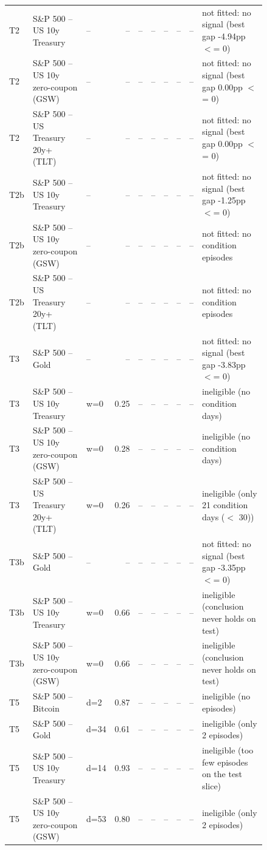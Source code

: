\begin{figure}
\begin{tabular}{lllrrrrrrl}
T2 & S\&P 500 -- US 10y Treasury & -- & -- & -- & -- & -- & -- & -- & not fitted: no signal (best gap -4.94pp $<$= 0) \\
T2 & S\&P 500 -- US 10y zero-coupon (GSW) & -- & -- & -- & -- & -- & -- & -- & not fitted: no signal (best gap 0.00pp $<$= 0) \\
T2 & S\&P 500 -- US Treasury 20y+ (TLT) & -- & -- & -- & -- & -- & -- & -- & not fitted: no signal (best gap 0.00pp $<$= 0) \\
T2b & S\&P 500 -- US 10y Treasury & -- & -- & -- & -- & -- & -- & -- & not fitted: no signal (best gap -1.25pp $<$= 0) \\
T2b & S\&P 500 -- US 10y zero-coupon (GSW) & -- & -- & -- & -- & -- & -- & -- & not fitted: no condition episodes \\
T2b & S\&P 500 -- US Treasury 20y+ (TLT) & -- & -- & -- & -- & -- & -- & -- & not fitted: no condition episodes \\
T3 & S\&P 500 -- Gold & -- & -- & -- & -- & -- & -- & -- & not fitted: no signal (best gap -3.83pp $<$= 0) \\
T3 & S\&P 500 -- US 10y Treasury & w=0 & 0.25 & -- & -- & -- & -- & -- & ineligible (no condition days) \\
T3 & S\&P 500 -- US 10y zero-coupon (GSW) & w=0 & 0.28 & -- & -- & -- & -- & -- & ineligible (no condition days) \\
T3 & S\&P 500 -- US Treasury 20y+ (TLT) & w=0 & 0.26 & -- & -- & -- & -- & -- & ineligible (only 21 condition days ($<$ 30)) \\
T3b & S\&P 500 -- Gold & -- & -- & -- & -- & -- & -- & -- & not fitted: no signal (best gap -3.35pp $<$= 0) \\
T3b & S\&P 500 -- US 10y Treasury & w=0 & 0.66 & -- & -- & -- & -- & -- & ineligible (conclusion never holds on test) \\
T3b & S\&P 500 -- US 10y zero-coupon (GSW) & w=0 & 0.66 & -- & -- & -- & -- & -- & ineligible (conclusion never holds on test) \\
T5 & S\&P 500 -- Bitcoin & d=2 & 0.87 & -- & -- & -- & -- & -- & ineligible (no episodes) \\
T5 & S\&P 500 -- Gold & d=34 & 0.61 & -- & -- & -- & -- & -- & ineligible (only 2 episodes) \\
T5 & S\&P 500 -- US 10y Treasury & d=14 & 0.93 & -- & -- & -- & -- & -- & ineligible (too few episodes on the test slice) \\
T5 & S\&P 500 -- US 10y zero-coupon (GSW) & d=53 & 0.80 & -- & -- & -- & -- & -- & ineligible (only 2 episodes) \\

\end{tabular}
\end{figure}
